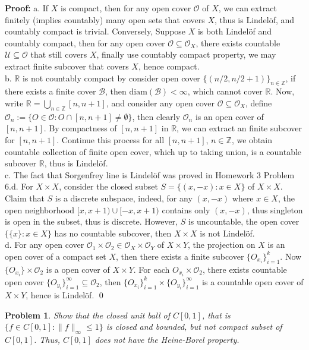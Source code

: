 \documentclass[12pt]{article}
\newtheorem{problem}{Problem}
\begin{document}
\textbf{Proof:} a. If $X$ is compact, then for any open cover $\mathcal{O}$ of $X$, we can extract finitely (implies countably) many open sets that covers $X$, thus is Lindelöf, and countably compact is trivial. Conversely, Suppose $X$ is both Lindelöf and countably compact, then for any open cover $\mathcal{O}\subseteq\mathcal{O}_{X}$, there exists countable $\mathcal{U}\subseteq\mathcal{O}$ that still covers $X$, finally use countably compact property, we may extract finite subcover that covers $X$, hence compact. \\ 
\indent b. $\mathbb{R}$ is not countably compact by consider open cover $\{(n/2, n/2+1)\}_{n\in\mathbb{Z}}$, if there exists a finite cover $\mathcal{B}$, then $\text{diam}(\mathcal{B})<\infty$, which cannot cover $\mathbb{R}$. Now, write $\mathbb{R}=\bigcup_{n\in\mathbb{Z}}[n, n+1]$, and consider any open cover $\mathcal{O}\subseteq\mathcal{O}_X$, define $\mathcal{O}_n:=\{O\in\mathcal{O}: O\cap [n,n+1]\neq\emptyset\}$, then clearly $\mathcal{O}_n$ is an open cover of $[n,n+1]$. By compactness of $[n,n+1]$ in $\mathbb{R}$, we can extract an finite subcover for $[n,n+1]$. Continue this process for all $[n,n+1]$, $n\in\mathbb{Z}$, we obtain countable collection of finite open cover, which up to taking union, is a countable subcover $\mathbb{R}$, thus is Lindelöf. \\
\indent c. The fact that Sorgenfrey line is Lindelöf was proved in Homework 3 Problem 6.d. For $X\times X$, consider the closed subset $S=\{(x,-x): x\in X\}$ of $X\times X$. Claim that $S$ is a discrete subspace, indeed, for any $(x, -x)$ where $x\in X$, the open neighborhood $[x,x+1)\cup [-x,x+1)$ contains only $(x,-x)$, thus singleton is open in the subset, thus is discrete. However, $S$ is uncountable, the open cover $\{\{x\}: x\in X\}$ has no countable subcover, then $X\times X$ is not Lindelöf. \\
\indent d. For any open cover $\mathcal{O}_1\times\mathcal{O}_2\in\mathcal{O}_X\times\mathcal{O}_Y$ of $X\times Y$, the projection on $X$ is an open cover of a compact set $X$, then there exists a finite subcover $\{O_{x_{i}}\}_{i=1}^k$. Now $\{O_{x_i}\}\times\mathcal{O}_2$ is a open cover of $X\times Y$. For each $O_{x_i}\times \mathcal{O}_2$, there exists countable open cover $\{O_{y_i}\}_{i=1}^\infty\subseteq\mathcal{O}_2$, then $\{O_{x_i}\}_{i=1}^{k}\times \{O_{y_i}\}_{i=1}^\infty$ is a countable open cover of $X\times Y$, hence is Lindelöf. \qed
\\
\begin{problem}
Show that the closed unit ball of $C[0,1]$, that is $\{f\in C[0,1]: \|f\|_\infty\leq 1\}$ is closed and bounded, but not compact subset of $C[0,1]$. Thus, $C[0,1]$ does not have the Heine-Borel property.
\end{problem}
\end{document}
